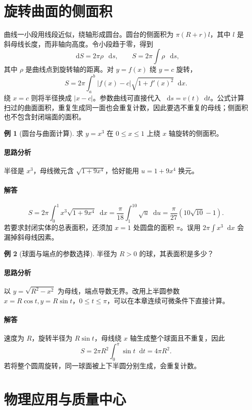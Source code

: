 \documentclass[UTF8,fontset=fandol,12pt,oneside,openany]{ctexrep}
\newcommand{\dd}{\mathop{}\!\mathrm d}
\theoremstyle{definition}
\newtheorem{example}{例}[chapter]
\begin{document}
\section{旋转曲面的侧面积}
\label{lec:12:surface}
曲线一小段用线段近似，绕轴形成圆台。圆台的侧面积为 $\pi(R+r)l$，其中 $l$ 是斜母线长度，而非轴向高度。令小段趋于零，得到
\[
 \dd S=2\pi\rho\,\dd s,\qquad S=2\pi\int\rho\,\dd s,
\]
其中 $\rho$ 是曲线点到旋转轴的距离。对 $y=f(x)$ 绕 $y=c$ 旋转，
\[
 S=2\pi\int_a^b|f(x)-c|\sqrt{1+f'(x)^2}\dd x.
\]
绕 $x=c$ 则将半径换成 $|x-c|$。参数曲线可直接代入 $\dd s=v(t)\dd t$。公式计算扫过的曲面面积，重复生成同一面也会重复计数，因此要选不重复的母线；侧面积也不包含封闭端面的面积。

\begin{example}[圆台与曲面计算]
求 $y=x^3$ 在 $0\le x\le1$ 上绕 $x$ 轴旋转的侧面积。
\end{example}
\paragraph{思路分析}半径是 $x^3$，母线微元含 $\sqrt{1+9x^4}$，恰好能用 $u=1+9x^4$ 换元。
\paragraph{解答}
\[
 S=2\pi\int_0^1x^3\sqrt{1+9x^4}\dd x
 =\frac\pi{18}\int_1^{10}\sqrt u\dd u
 =\frac\pi{27}(10\sqrt{10}-1).
\]
若要求封闭实体的总表面积，还须加 $x=1$ 处圆盘的面积 $\pi$。误用 $2\pi\int x^3\dd x$ 会漏掉斜母线因素。

\begin{example}[球面与端点的参数选择]
半径为 $R>0$ 的球，其表面积是多少？
\end{example}
\paragraph{思路分析}以 $y=\sqrt{R^2-x^2}$ 为母线，端点导数无界。改用上半圆参数 $x=R\cos t,y=R\sin t$，$0\le t\le\pi$，可以在本章连续可微条件下直接计算。
\paragraph{解答}速度为 $R$，旋转半径为 $R\sin t$，母线绕 $x$ 轴生成整个球面且不重复，因此
\[
 S=2\pi R^2\int_0^\pi\sin t\dd t=4\pi R^2.
\]
若将整个圆周旋转，同一球面被上下半圆分别生成，会重复计数。

\section{物理应用与质量中心}
\label{lec:12:physics}
\end{document}
